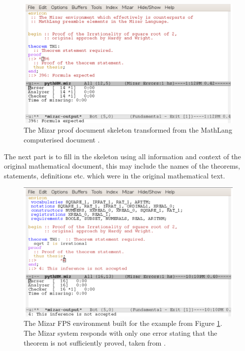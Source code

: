 \begin{figure}[H]
\begin{center}
\includegraphics[scale=0.35]{Figures/Background/mizarskel.png}
\end{center}
\caption{The Mizar proof document skeleton transformed from the MathLang
computerised document
\cite{krzysztofphd}. \label{fig:mizarfps}}
\end{figure}

The next part is to fill in the skeleton using all information and context of
the original mathematical document, this may include the names of the theorems,
statements, definitions etc. which were in the original mathematical text.

\begin{figure}[H]
\begin{center}
\includegraphics[scale=0.4]{Figures/Background/mizarskelfill.png}
\end{center}
\caption{The Mizar FPS environment built for the example from Figure \ref{fig:mizarfps}. The Mizar system responds with only one error stating that the theorem is not sufficiently proved, taken from \cite{krzysztofphd}. \label{fig:mizarfpsfill}}
\end{figure}

